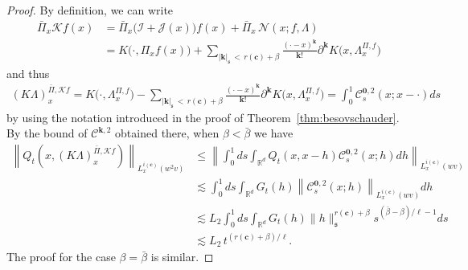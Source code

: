 \documentclass[AHL,Unicode,longabstracts,published]{cedram}
\newcommand{\bbR}{\mathbb{R}}
\newcommand{\mfs}{\mathfrak{s}}
\newcommand{\bfc}{\mathbf{c}}
\newcommand{\bfzo}{\mathbf{0}}
\newcommand{\bfk}{\mathbf{k}}
\newcommand{\mcK}{\mathcal{K}}
\newcommand{\mcI}{\mathcal{I}}
\newcommand{\mcJ}{\mathcal{J}}
\newcommand{\mcN}{\mathcal{N}}
\newcommand{\mcC}{\mathcal{C}}
\begin{document}
\begin{proof}
By definition, we can write
\begin{align*}
\bar{\Pi}_x\mcK f(x)&=\bar{\Pi}_x\big(\mcI+\mcJ(x)\big)f(x)+\bar{\Pi}_x\,\mcN(x;f,\Lambda)\\
&=K\big(\cdot,\Pi_xf(x)\big)+\sum_{|{\bfk}|_\mfs\,<\,r(\bfc)+\beta}\frac{(\cdot-x)^{\bfk}}{{\bfk}!}\partial^{\bfk}K\big(x,\Lambda_x^{\Pi,f}\big)
\end{align*}
and thus
\begin{align*}
(K\Lambda)_x^{\bar{\Pi},\mcK f}=K\big(\cdot,\Lambda_x^{\Pi,f}\big)-\sum_{|{\bfk}|_\mfs\,<\,r(\bfc)+\beta}\frac{(\cdot-x)^{\bfk}}{{\bfk}!}\partial^{\bfk}K\big(x,\Lambda_x^{\Pi,f}\big) =\int_0^1\mcC_s^{{\bfzo},2}(x;x-\cdot)ds
\end{align*}
by using the notation introduced in the proof of Theorem~\ref{thm:besovschauder}. By the bound of $\mcC^{{\bfk},2}$ obtained there, when $\beta<\bar\beta$ we have
\begin{align*}
\left\|Q_t\left(x,(K\Lambda)_x^{\bar{\Pi},\mcK f}\right)\right\|_{L_x^{i(\bfc)}(w^2v)} &\le\left\|\int_0^1ds\int_{\bbR^d}Q_t(x,x-h)\mcC_s^{{\bfzo},2}(x;h)dh\right\|_{L_x^{i(\bfc)}(wv)}\\
&\lesssim\int_0^1ds\int_{\bbR^d}G_t(h)\left\|\mcC_s^{{\bfzo},2}(x;h)\right\|_{L_x^{i(\bfc)}(wv)}dh\\
&\lesssim L_2
\int_0^1ds\int_{\bbR^d}G_t(h)\|h\|_\mfs^{r(\bfc)+\beta}s^{(\bar\beta-\beta)/\ell-1}ds\\
&\lesssim L_2\, t^{(r(\bfc)+\beta)/\ell}.
\end{align*}
The proof for the case $\beta=\bar\beta$ is similar.
\end{proof}


\end{document}
